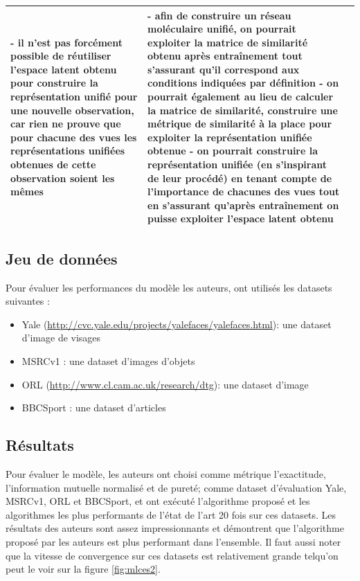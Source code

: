 \documentclass[12pt, french, latin.medieval, a4paper]{report}
\begin{document}
\begin{center}
\begin{longtable}{|p{5cm}|p{5cm}|p{4.5cm}|}
                    	{\textbf{-} il n'est pas forcément possible de réutiliser l'espace latent obtenu pour construire la représentation unifié pour une nouvelle observation, car rien ne prouve que pour chacune des vues les représentations unifiées obtenues de cette observation soient les mêmes}
                    	&
                    	{\textbf{-} afin de construire un réseau moléculaire unifié, on pourrait exploiter la matrice de similarité obtenu après entraînement tout s'assurant qu'il correspond aux conditions indiquées par définition}\newline\newline
                    	{\textbf{-} on pourrait également au lieu de calculer la matrice de similarité, construire une métrique de similarité à la place pour exploiter la représentation unifiée obtenue }\newline\newline
                    	{\textbf{-} on pourrait construire la représentation unifiée (en s'inspirant de leur procédé) en tenant compte de l'importance de chacunes des vues tout en s'assurant qu'après entraînement on puisse exploiter l'espace latent obtenu}
                	\\
                	\hline
            	\end{longtable}
        	\end{center}

    	\subsection{Jeu de données}
        	Pour évaluer les performances du modèle les auteurs, ont utilisés les datasets suivantes :
        	\begin{itemize}
            	\item Yale (\href{http://cvc.yale.edu/projects/yalefaces/yalefaces.html}{http://cvc.yale.edu/projects/yalefaces/yalefaces.html}): une dataset d'image de visages
            	\item MSRCv1 : une dataset d'images d'objets
            	\item ORL (\href{http://www.cl.cam.ac.uk/research/dtg/}{http://www.cl.cam.ac.uk/research/dtg}): une dataset d'image
            	\item BBCSport : une dataset d'articles
        	\end{itemize}

         \subsection{Résultats}
            Pour évaluer le modèle, les auteurs ont choisi comme métrique l'exactitude, l'information mutuelle normalisé et de pureté; comme dataset d'évaluation Yale, MSRCv1, ORL et BBCSport, et ont exécuté l'algorithme proposé et les algorithmes les plus performants de l'état de l'art 20 fois sur ces datasets. Les résultats des auteurs sont assez impressionnants et démontrent que l'algorithme proposé par les auteurs est plus performant dans l'ensemble. Il faut aussi noter que la vitesse de convergence sur ces datasets est relativement grande telqu'on peut le voir sur la figure \ref{fig:mlces2}.
\end{document}
